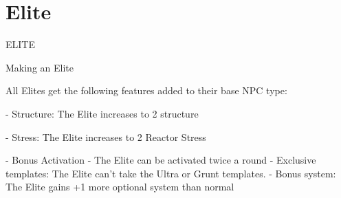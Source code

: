 \section{Elite}
                                                   ELITE

Making an Elite

All Elites get the following features added to their base NPC type:

    -   Structure: The Elite increases to 2 structure

    -   Stress: The Elite increases to 2 Reactor Stress

    -    Bonus Activation - The Elite can be activated twice a round
    -    Exclusive templates: The Elite can’t take the Ultra or Grunt templates.
    -    Bonus system: The Elite gains +1 more optional system than normal